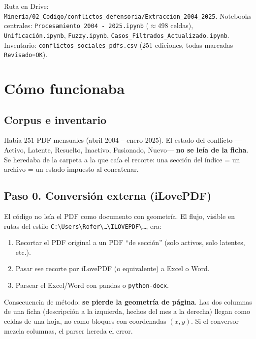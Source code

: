 \documentclass[11pt,a4paper]{article}
\begin{document}
Ruta en Drive: \texttt{Minería/02\_Codigo/conflictos\_defensoria/Extraccion\_2004\_2025}. Notebooks centrales: \texttt{Procesamiento 2004 - 2025.ipynb} ($\approx$498 celdas), \texttt{Unificación.ipynb}, \texttt{Fuzzy.ipynb}, \texttt{Casos\_Filtrados\_Actualizado.ipynb}. Inventario: \texttt{conflictos\_sociales\_pdfs.csv} (251 ediciones, todas marcadas \texttt{Revisado=OK}).

\section{Cómo funcionaba}

\subsection{Corpus e inventario}

Había 251 PDF mensuales (abril 2004 -- enero 2025). El estado del conflicto ---Activo, Latente, Resuelto, Inactivo, Fusionado, Nuevo--- \textbf{no se leía de la ficha}. Se heredaba de la carpeta a la que caía el recorte: una sección del índice = un archivo = un estado impuesto al concatenar.

\subsection{Paso 0. Conversión externa (iLovePDF)}

El código no leía el PDF como documento con geometría. El flujo, visible en rutas del estilo \texttt{C:\textbackslash Users\textbackslash Rofer\textbackslash \ldots\textbackslash ILOVEPDF\textbackslash \ldots}, era:

\begin{enumerate}
  \item Recortar el PDF original a un PDF ``de sección'' (solo activos, solo latentes, etc.).
  \item Pasar ese recorte por iLovePDF (o equivalente) a Excel o Word.
  \item Parsear el Excel/Word con pandas o \texttt{python-docx}.
\end{enumerate}

Consecuencia de método: \textbf{se pierde la geometría de página}. Las dos columnas de una ficha (descripción a la izquierda, hechos del mes a la derecha) llegan como celdas de una hoja, no como bloques con coordenadas $(x,y)$. Si el conversor mezcla columnas, el parser hereda el error.
\end{document}
